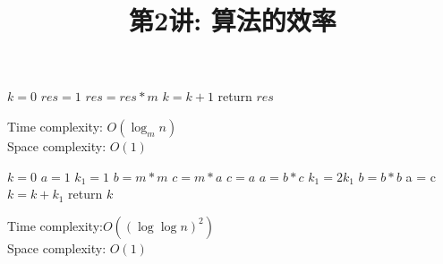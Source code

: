\documentclass[a4paper, justified]{tufte-handout}
\title{第2讲: 算法的效率}
\date{\zhtoday} %
\begin{document}
\maketitle
\noplagiarism %
\begin{abstract}
\end{abstract}
\beginrequired

\begin{problem}
\end{problem}

\begin{solution}
  \begin{algorithm}
    \caption{$\log_{m} n$}
    \label{alg:sum}
    \begin{algorithmic}[1]
      \State $k = 0$
      \State $res = 1$
      \State $res = res * m$
      \State $k = k + 1$
      \EndWhile
      \State return $res$
      \EndFunction
    \end{algorithmic}
  \end{algorithm}

  Time complexity: $O (\log_m n)$\\
  Space complexity: $O(1)$\\
\end{solution}

\begin{problem}
\end{problem}

\begin{solution}
  \begin{algorithm}
    \caption{$\log_{m} n$}
    \label{alg:sum}
    \begin{algorithmic}[1]
      \State $k = 0$
      \State $a = 1$
      \State $k_1 = 1 $
      \State $b = m * m$
      \State $c = m * a$
      \State $c = a$
      \State $a = b * c$
      \State $k_1 = 2k_1$
      \State $b = b * b$
      \EndWhile
      \State a = c
      \State $k = k + k_1$
      \EndWhile
      \State return $k$
      \EndFunction
    \end{algorithmic}
  \end{algorithm}
  Time complexity:$O ((\log \log n)^2)$\\
  Space complexity: $O(1)$
\end{solution}
\end{document}
